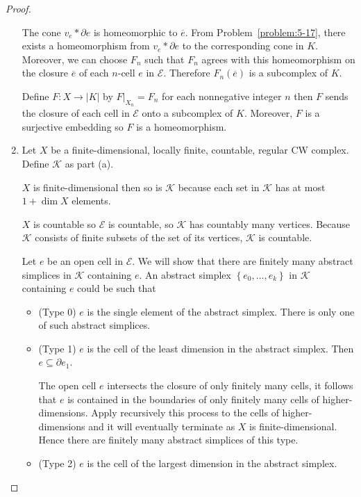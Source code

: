 \begin{proof}
\begin{enumerate}[label={(\alph*)}]
		      The cone \( v_{e} \ast \partial e \) is homeomorphic to \( \overline{e} \). From Problem~\ref{problem:5-17}, there exists a homeomorphism from \( v_{e} \ast \partial e \) to the corresponding cone in \( K \). Moreover, we can choose \( F_{n} \) such that \( F_{n} \) agrees with this homeomorphism on the closure \( \overline{e} \) of each \( n \)-cell \( e \) in \( \mathcal{E} \). Therefore \( F_{n}(\overline{e}) \) is a subcomplex of \( K \).

		      Define \( F: X \to \left\vert K \right\vert \) by \( F\vert_{X_{n}} = F_{n} \) for each nonnegative integer \( n \) then \( F \) sends the closure of each cell in \( \mathcal{E} \) onto a subcomplex of \( K \). Moreover, \( F \) is a surjective embedding so \( F \) is a homeomorphism.
		\item Let \( X \) be a finite-dimensional, locally finite, countable, regular CW complex. Define \( \mathcal{K} \) as part (a).

		      \( X \) is finite-dimensional then so is \( \mathcal{K} \) because each set in \( \mathcal{K} \) has at most \( 1 + \dim X \) elements.

		      \( X \) is countable so \( \mathcal{E} \) is countable, so \( \mathcal{K} \) has countably many vertices. Because \( \mathcal{K} \) consists of finite subsets of the set of its vertices, \( \mathcal{K} \) is countable.

		      Let \( e \) be an open cell in \( \mathcal{E} \). We will show that there are finitely many abstract simplices in \( \mathcal{K} \) containing \( e \). An abstract simplex \( \left\{ e_{0}, \ldots, e_{k} \right\} \) in \( \mathcal{K} \) containing \( e \) could be such that
		      \begin{itemize}[leftmargin=*]
			      \item (Type 0) \( e \) is the single element of the abstract simplex. There is only one of such abstract simplices.
			      \item (Type 1) \( e \) is the cell of the least dimension in the abstract simplex. Then \( e \subseteq \partial e_{1} \).

			            The open cell \( e \) intersects the closure of only finitely many cells, it follows that \( e \) is contained in the boundaries of only finitely many cells of higher-dimensions. Apply recursively this process to the cells of higher-dimensions and it will eventually terminate as \( X \) is finite-dimensional. Hence there are finitely many abstract simplices of this type.
			      \item (Type 2) \( e \) is the cell of the largest dimension in the abstract simplex.


\end{itemize}
\end{enumerate}
\end{proof}
